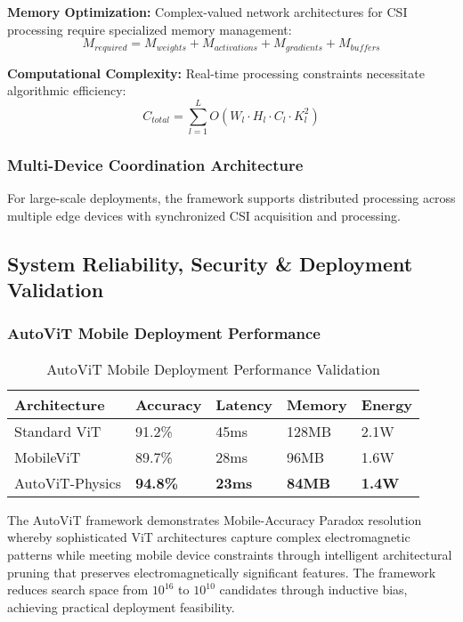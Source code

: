 \documentclass[journal]{IEEEtran}
\begin{document}
\textbf{Memory Optimization:} Complex-valued network architectures for CSI processing require specialized memory management:
\begin{equation}
M_{required} = M_{weights} + M_{activations} + M_{gradients} + M_{buffers}
\label{eq:memory_budget}
\end{equation}

\textbf{Computational Complexity:} Real-time processing constraints necessitate algorithmic efficiency:
\begin{equation}
C_{total} = \sum_{l=1}^{L} O(W_l \cdot H_l \cdot C_l \cdot K_l^2)
\label{eq:computational_complexity}
\end{equation}

\subsubsection{Multi-Device Coordination Architecture}

For large-scale deployments, the framework supports distributed processing across multiple edge devices with synchronized CSI acquisition and processing.

\subsection{System Reliability, Security \& Deployment Validation}

\subsubsection{AutoViT Mobile Deployment Performance}

\begin{table}[h]
\centering
\caption{AutoViT Mobile Deployment Performance Validation}
\label{tab:autovit_mobile_deployment}
\begin{tabular}{|p{1.8cm}|p{1.5cm}|p{1.2cm}|p{1.0cm}|p{1.0cm}|}
\hline
\textbf{Architecture} & \textbf{Accuracy} & \textbf{Latency} & \textbf{Memory} & \textbf{Energy} \\
\hline
Standard ViT & 91.2\% & 45ms & 128MB & 2.1W \\
MobileViT & 89.7\% & 28ms & 96MB & 1.6W \\
AutoViT-Physics & \textbf{94.8\%} & \textbf{23ms} & \textbf{84MB} & \textbf{1.4W} \\
\hline
\end{tabular}
\end{table}

The AutoViT framework demonstrates Mobile-Accuracy Paradox resolution whereby sophisticated ViT architectures capture complex electromagnetic patterns while meeting mobile device constraints through intelligent architectural pruning that preserves electromagnetically significant features. The framework reduces search space from $10^{16}$ to $10^{10}$ candidates through inductive bias, achieving practical deployment feasibility.
\end{document}
